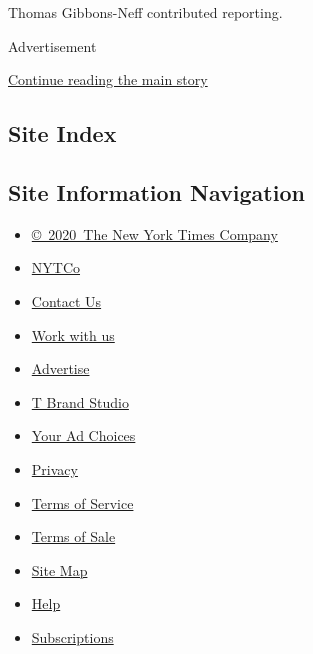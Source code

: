 Thomas Gibbons-Neff contributed reporting.

Advertisement

\protect\hyperlink{after-bottom}{Continue reading the main story}

\hypertarget{site-index}{%
\subsection{Site Index}\label{site-index}}

\hypertarget{site-information-navigation}{%
\subsection{Site Information
Navigation}\label{site-information-navigation}}

\begin{itemize}
\tightlist
\item
  \href{https://help.nytimes.com/hc/en-us/articles/115014792127-Copyright-notice}{©~2020~The
  New York Times Company}
\end{itemize}

\begin{itemize}
\tightlist
\item
  \href{https://www.nytco.com/}{NYTCo}
\item
  \href{https://help.nytimes.com/hc/en-us/articles/115015385887-Contact-Us}{Contact
  Us}
\item
  \href{https://www.nytco.com/careers/}{Work with us}
\item
  \href{https://nytmediakit.com/}{Advertise}
\item
  \href{http://www.tbrandstudio.com/}{T Brand Studio}
\item
  \href{https://www.nytimes.com/privacy/cookie-policy\#how-do-i-manage-trackers}{Your
  Ad Choices}
\item
  \href{https://www.nytimes.com/privacy}{Privacy}
\item
  \href{https://help.nytimes.com/hc/en-us/articles/115014893428-Terms-of-service}{Terms
  of Service}
\item
  \href{https://help.nytimes.com/hc/en-us/articles/115014893968-Terms-of-sale}{Terms
  of Sale}
\item
  \href{https://spiderbites.nytimes.com}{Site Map}
\item
  \href{https://help.nytimes.com/hc/en-us}{Help}
\item
  \href{https://www.nytimes.com/subscription?campaignId=37WXW}{Subscriptions}
\end{itemize}

